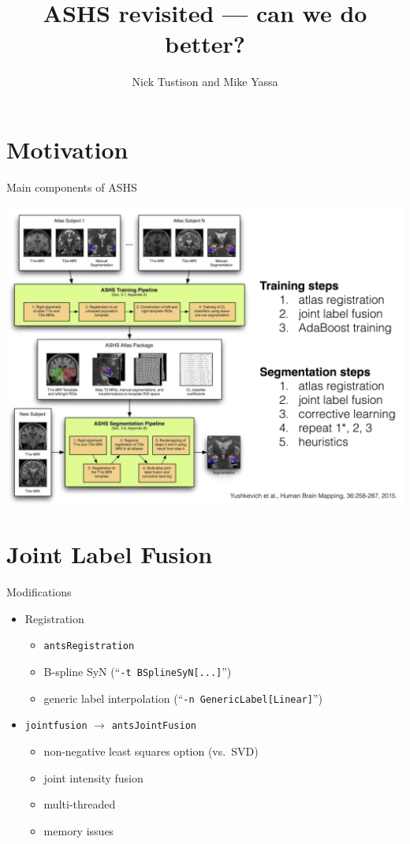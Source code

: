 \documentclass[ignorenonframetext,]{beamer}
\institute{UCI}
\title{ASHS revisited --- can we do better?}
\author{Nick Tustison and Mike Yassa}
\date{}
\providecommand{\tightlist}{%
  \setlength{\itemsep}{0pt}\setlength{\parskip}{0pt}}
\begin{document}
\frame{\titlepage}

\section{Motivation}\label{motivation}

\begin{frame}{Main components of ASHS}

\centering
\includegraphics[width=0.85 \textwidth]{../Figures/ashs.png}

\end{frame}

\section{Joint Label Fusion}\label{joint-label-fusion}

\begin{frame}[fragile]{Modifications}

\begin{itemize}
\tightlist
\item
  Registration

  \begin{itemize}
  \tightlist
  \item
    \texttt{antsRegistration}
  \item
    B-spline SyN (``\texttt{-t\ BSplineSyN{[}...{]}}'')
  \item
    generic label interpolation
    (``\texttt{-n\ GenericLabel{[}Linear{]}}'')
  \end{itemize}
\item
  \texttt{jointfusion} \(\rightarrow\) \texttt{antsJointFusion}

  \begin{itemize}
  \tightlist
  \item
    non-negative least squares option (vs.~SVD)
  \item
    joint intensity fusion
  \item
    multi-threaded
  \item
    memory issues
  \end{itemize}
\end{itemize}

\end{frame}
\end{document}
